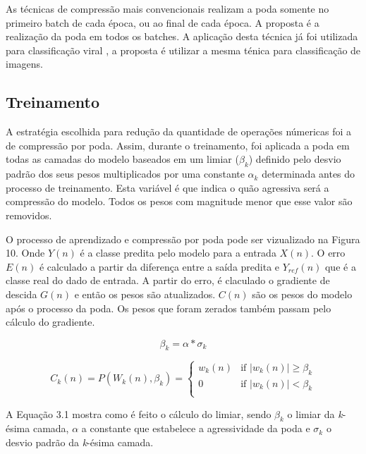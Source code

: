 As técnicas de compressão mais convencionais realizam a poda somente no primeiro batch de cada época, ou ao final de cada época. A proposta é a realização da poda em todos os batches. A aplicação desta técnica já foi utilizada para classificação viral \cite{fernandes2021}, a proposta é utilizar a mesma ténica para classificação de imagens.


\subsection{Treinamento} \label{secao11}

A estratégia escolhida para redução da quantidade de operações númericas foi a de compressão por poda. Assim, durante o treinamento, foi aplicada a poda em todas as camadas do modelo baseados em um limiar ($ \beta_k $) definido pelo desvio padrão dos seus pesos multiplicados por uma constante $ \alpha_k $ determinada antes do processo de treinamento. Esta variável é que indica o quão agressiva será a compressão do modelo. Todos os pesos com magnitude menor que esse valor são removidos. 

O processo de aprendizado e compressão por poda pode ser vizualizado na Figura 10. Onde $Y(n)$ é a classe predita pelo modelo para a entrada $X(n)$. O erro $E(n)$ é calculado a partir da diferença entre a saída predita e $Y_{ref}(n)$ que é a classe real do dado de entrada. A partir do erro, é claculado o gradiente de descida $G(n)$ e então os pesos são atualizados. $C(n)$ são os pesos do modelo após o processo da poda. Os pesos que foram zerados também passam pelo cálculo do gradiente.

\begin{equation}
    \beta_k = \alpha * \sigma_k
\end{equation}

\begin{equation}
    C_k(n) = P(W_k(n),\beta_k) =
    \begin{cases}
      w_k(n) & \text{if } |w_k(n)|\geq \beta_k \\
      0 & \text{if } |w_k(n)| < \beta_k\\
    \end{cases} 
\end{equation}

A Equação 3.1 mostra como é feito o cálculo do limiar, sendo $ \beta_k $ o limiar da \textit{k}-ésima camada, $\alpha$ a constante que estabelece a agressividade da poda e $\sigma_k$ o desvio padrão da \textit{k}-ésima camada.

